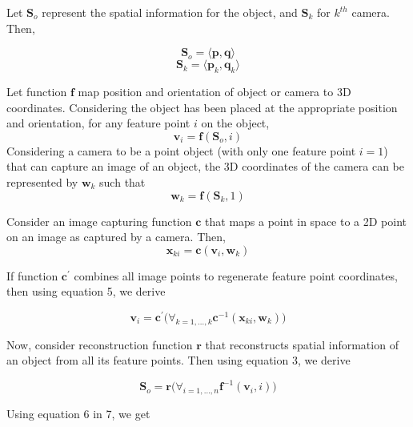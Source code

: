 \documentclass[12pt,a4paper]{article}
\begin{document}
Let $\textbf{S}_o$ represent the spatial information for the object, and $\textbf{S}_k$ for $k^{th}$ camera. Then,


\begin{equation}
\textbf{S}_o = \langle \textbf{p},\textbf{q} \rangle
\end{equation}
\begin{equation}
\textbf{S}_k = \langle \textbf{p}_k,\textbf{q}_k \rangle
\end{equation}

Let function $\textbf{f}$ map position and orientation of object or camera to 3D coordinates. Considering the object has been placed at the appropriate position and orientation, for any feature point $i$ on the object,
\begin{equation}
    \textbf{v}_i = \textbf{f}(\textbf{S}_o, i)
\end{equation}
Considering a camera to be a point object (with only one feature point $i=1$) that can capture an image of an object, the 3D coordinates of the camera can be represented by $\textbf{w}_k$ such that
\begin{equation}
    \textbf{w}_k = \textbf{f}(\textbf{S}_k, 1)
\end{equation}

Consider an image capturing function $\textbf{c}$ that maps a point in space to a 2D point on an image as captured by a camera. Then,
\begin{equation}
    \textbf{x}_{ki} = \textbf{c}(\textbf{v}_i, \textbf{w}_k)
\end{equation}

If function $\textbf{c}^\prime$ combines all image points to regenerate feature point coordinates, then using equation 5, we derive

\begin{equation}
 \textbf{v}_i = \textbf{c}^\prime\Big(\forall_{k=1,\dots,k}	 \textbf{c}^{-1}(\textbf{x}_{ki}, \textbf{w}_k)\Big)
\end{equation}

Now, consider reconstruction function $\textbf{r}$ that reconstructs spatial information of an object from all its feature points. Then using equation 3, we derive

\begin{equation}
\textbf{S}_o = \textbf{r}\Big(\forall_{i=1,\dots,n}	 \textbf{f}^{-1}(\textbf{v}_{i}, i)\Big)
\end{equation}

Using equation 6 in 7, we get
\end{document}
